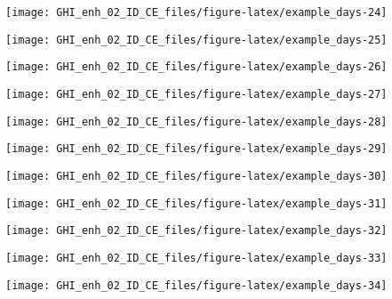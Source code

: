\documentclass[
  10pt,
  a4paper,oneside]{article}
\begin{document}
\begin{center}\texttt{[image: GHI\_enh\_02\_ID\_CE\_files/figure-latex/example\_days-24]} \end{center}

\begin{center}\texttt{[image: GHI\_enh\_02\_ID\_CE\_files/figure-latex/example\_days-25]} \end{center}

\begin{center}\texttt{[image: GHI\_enh\_02\_ID\_CE\_files/figure-latex/example\_days-26]} \end{center}

\begin{center}\texttt{[image: GHI\_enh\_02\_ID\_CE\_files/figure-latex/example\_days-27]} \end{center}

\begin{center}\texttt{[image: GHI\_enh\_02\_ID\_CE\_files/figure-latex/example\_days-28]} \end{center}

\begin{center}\texttt{[image: GHI\_enh\_02\_ID\_CE\_files/figure-latex/example\_days-29]} \end{center}

\begin{center}\texttt{[image: GHI\_enh\_02\_ID\_CE\_files/figure-latex/example\_days-30]} \end{center}

\begin{center}\texttt{[image: GHI\_enh\_02\_ID\_CE\_files/figure-latex/example\_days-31]} \end{center}

\begin{center}\texttt{[image: GHI\_enh\_02\_ID\_CE\_files/figure-latex/example\_days-32]} \end{center}

\begin{center}\texttt{[image: GHI\_enh\_02\_ID\_CE\_files/figure-latex/example\_days-33]} \end{center}

\begin{center}\texttt{[image: GHI\_enh\_02\_ID\_CE\_files/figure-latex/example\_days-34]} \end{center}
\end{document}
